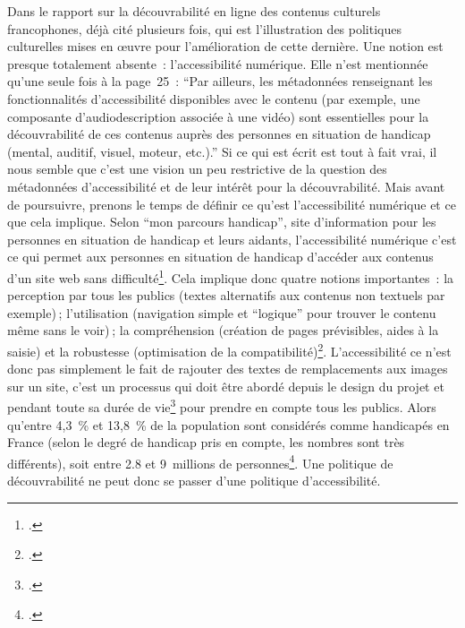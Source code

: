 Dans le rapport sur la découvrabilité en ligne des contenus culturels francophones, déjà cité plusieurs fois, qui est l’illustration des politiques culturelles mises en œuvre pour l’amélioration de cette dernière. Une notion est presque totalement absente : l’accessibilité numérique. Elle n’est mentionnée qu’une seule fois à la page 25 : \enquote{Par ailleurs, les métadonnées renseignant les fonctionnalités d’accessibilité disponibles avec le contenu (par exemple, une composante d’audiodescription associée à une vidéo) sont essentielles pour la découvrabilité de ces contenus auprès des personnes en situation de handicap (mental, auditif, visuel, moteur, etc.).} Si ce qui est écrit est tout à fait vrai, il nous semble que c’est une vision un peu restrictive de la question des métadonnées d’accessibilité et de leur intérêt pour la découvrabilité. Mais avant de poursuivre, prenons le temps de définir ce qu’est l’accessibilité numérique et ce que cela implique. Selon \enquote{mon parcours handicap}, site d’information pour les personnes en situation de handicap et leurs aidants, l’accessibilité numérique c’est ce qui permet aux personnes en situation de handicap d’accéder aux contenus d’un site web sans difficulté\footcite{noauthor_accessibilite_nodate}. Cela implique donc quatre notions importantes : la perception par tous les publics (textes alternatifs aux contenus non textuels par exemple) ; l’utilisation (navigation simple et \enquote{logique} pour trouver le contenu même sans le voir) ; la compréhension (création de pages prévisibles, aides à la saisie) et la robustesse (optimisation de la compatibilité)\footcite{noauthor_notion_nodate}. L’accessibilité ce n’est donc pas simplement le fait de rajouter des textes de remplacements aux images sur un site, c’est un processus qui doit être abordé depuis le design du projet et pendant toute sa durée de vie\footcite{noauthor_accessibilite_nodate} pour prendre en compte tous les publics. Alors qu’entre 4,3 \% et 13,8 \% de la population sont considérés comme handicapés en France (selon le degré de handicap pris en compte, les nombres sont très différents), soit entre 2.8 et 9 millions de personnes\footcite{noauthor_personnes_2022}. Une politique de découvrabilité ne peut donc se passer d’une politique d’accessibilité.

